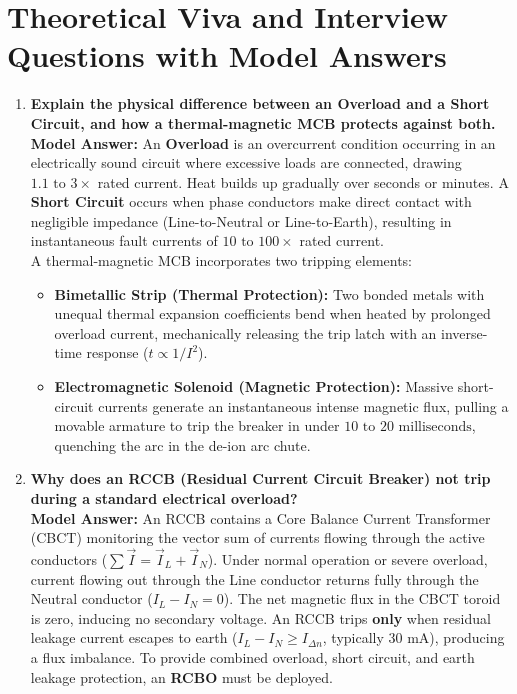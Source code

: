 \section{Theoretical Viva and Interview Questions with Model Answers}

\begin{enumerate}[leftmargin=*,label=\textbf{Q\arabic*.}]
    \item \textbf{Explain the physical difference between an Overload and a Short Circuit, and how a thermal-magnetic MCB protects against both.} \\
    \textbf{Model Answer:} An \textbf{Overload} is an overcurrent condition occurring in an electrically sound circuit where excessive loads are connected, drawing $1.1\text{ to }3\times$ rated current. Heat builds up gradually over seconds or minutes. A \textbf{Short Circuit} occurs when phase conductors make direct contact with negligible impedance (Line-to-Neutral or Line-to-Earth), resulting in instantaneous fault currents of $10\text{ to }100\times$ rated current. \\
    A thermal-magnetic MCB incorporates two tripping elements:
    \begin{itemize}
        \item \textbf{Bimetallic Strip (Thermal Protection):} Two bonded metals with unequal thermal expansion coefficients bend when heated by prolonged overload current, mechanically releasing the trip latch with an inverse-time response ($t \propto 1/I^2$).
        \item \textbf{Electromagnetic Solenoid (Magnetic Protection):} Massive short-circuit currents generate an instantaneous intense magnetic flux, pulling a movable armature to trip the breaker in under $10\text{ to }20\text{ milliseconds}$, quenching the arc in the de-ion arc chute.
    \end{itemize}

    \item \textbf{Why does an RCCB (Residual Current Circuit Breaker) not trip during a standard electrical overload?} \\
    \textbf{Model Answer:} An RCCB contains a Core Balance Current Transformer (CBCT) monitoring the vector sum of currents flowing through the active conductors ($\sum \vec{I} = \vec{I}_L + \vec{I}_N$). Under normal operation or severe overload, current flowing out through the Line conductor returns fully through the Neutral conductor ($I_L - I_N = 0$). The net magnetic flux in the CBCT toroid is zero, inducing no secondary voltage. An RCCB trips \textbf{only} when residual leakage current escapes to earth ($I_L - I_N \ge I_{\Delta n}$, typically $30\text{ mA}$), producing a flux imbalance. To provide combined overload, short circuit, and earth leakage protection, an \textbf{RCBO} must be deployed.


\end{enumerate}
